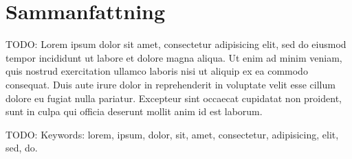 
\thispagestyle{plain}			%


\section*{Sammanfattning}
TODO: Lorem ipsum dolor sit amet, consectetur adipisicing elit, sed do eiusmod tempor incididunt ut labore et dolore magna aliqua. Ut enim ad minim veniam, quis nostrud exercitation ullamco laboris nisi ut aliquip ex ea commodo consequat. Duis aute irure dolor in reprehenderit in voluptate velit esse cillum dolore eu fugiat nulla pariatur. Excepteur sint occaecat cupidatat non proident, sunt in culpa qui officia deserunt mollit anim id est laborum.

\vfill
TODO: Keywords: lorem, ipsum, dolor, sit, amet, consectetur, adipisicing, elit, sed, do.

\newpage				%
\thispagestyle{empty}
\mbox{}